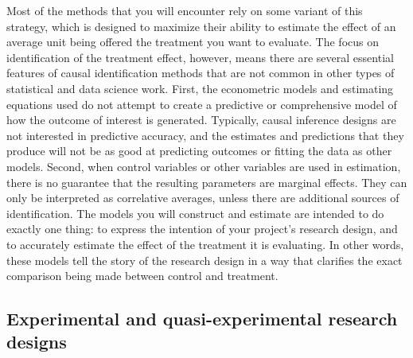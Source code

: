 Most of the methods that you will encounter rely on some variant of this strategy,
which is designed to maximize their ability to estimate the effect
of an average unit being offered the treatment you want to evaluate.
The focus on identification of the treatment effect, however,
means there are several essential features of causal identification methods
that are not common in other types of statistical and data science work.
First, the econometric models and estimating equations used
do not attempt to create a predictive or comprehensive model
of how the outcome of interest is generated.
Typically, causal inference designs are not interested in predictive accuracy,
and the estimates and predictions that they produce
will not be as good at predicting outcomes or fitting the data as other models.
Second, when control variables or other variables are used in estimation,
there is no guarantee that the resulting parameters are marginal effects.
They can only be interpreted as correlative averages,
unless there are additional sources of identification.
The models you will construct and estimate are intended to do exactly one thing:
to express the intention of your project's research design,
and to accurately estimate the effect of the treatment it is evaluating.
In other words, these models tell the story of the research design
in a way that clarifies the exact comparison being made between control and treatment.

\subsection{Experimental and quasi-experimental research designs}

